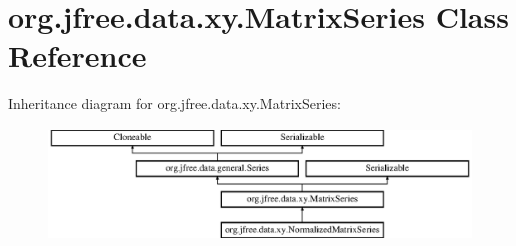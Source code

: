 \hypertarget{classorg_1_1jfree_1_1data_1_1xy_1_1_matrix_series}{}\section{org.\+jfree.\+data.\+xy.\+Matrix\+Series Class Reference}
\label{classorg_1_1jfree_1_1data_1_1xy_1_1_matrix_series}
Inheritance diagram for org.\+jfree.\+data.\+xy.\+Matrix\+Series\+:\begin{figure}[H]
\begin{center}
\leavevmode
\includegraphics[height=2.962963cm]{classorg_1_1jfree_1_1data_1_1xy_1_1_matrix_series}
\end{center}
\end{figure}
